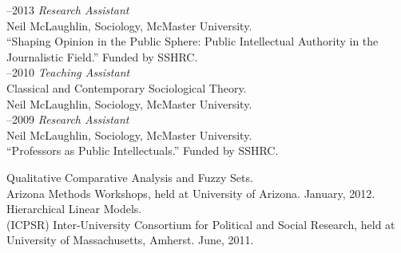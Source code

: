 \documentclass[11pt,usenames,dvipsnames]{article}
\begin{document}

–2013 {\it Research Assistant}\\
Neil McLaughlin, Sociology, McMaster University.\\ 
``Shaping Opinion in the Public Sphere: Public Intellectual Authority in the Journalistic Field.'' Funded by SSHRC.\\

–2010 {\it Teaching Assistant}\\
Classical and Contemporary Sociological Theory.\\
Neil McLaughlin, Sociology, McMaster University.\\

–2009 {\it Research Assistant}\\
Neil McLaughlin, Sociology, McMaster University.\\ 
``Professors as Public Intellectuals.'' Funded by SSHRC.\\






\noindent Qualitative Comparative Analysis and Fuzzy Sets.\\ 
Arizona Methods Workshops, held at University of Arizona. January, 2012.\\

\noindent Hierarchical Linear Models.\\ 
(ICPSR) Inter-University Consortium for Political and Social Research, held at University of Massachusetts, Amherst. June, 2011.\\
\end{document}
